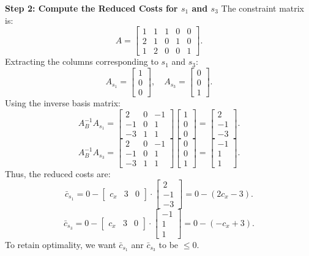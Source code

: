 \textbf{Step 2: Compute the Reduced Costs for \( s_1 \) and \( s_3 \)}
The constraint matrix is:
\[
    A = \begin{bmatrix} 
    1 & 1 & 1 & 0 & 0 \\ 
    2 & 1 & 0 & 1 & 0 \\ 
    1 & 2 & 0 & 0 & 1 
    \end{bmatrix}.
\]
Extracting the columns corresponding to \( s_1 \) and \( s_3 \):
\[
    A_{s_1} = \begin{bmatrix} 1 \\ 0 \\ 0 \end{bmatrix}, \quad
    A_{s_3} = \begin{bmatrix} 0 \\ 0 \\ 1 \end{bmatrix}.
\]
Using the inverse basis matrix:
\[
    A_B^{-1} A_{s_1} = 
    \begin{bmatrix} 
    2 & 0 & -1 \\ 
    -1 & 0 & 1 \\ 
    -3 & 1 & 1
    \end{bmatrix}
    \begin{bmatrix} 1 \\ 0 \\ 0 \end{bmatrix} =
    \begin{bmatrix} 2 \\ -1 \\ -3 \end{bmatrix}.
\]
\[
    A_B^{-1} A_{s_3} = 
    \begin{bmatrix} 
    2 & 0 & -1 \\ 
    -1 & 0 & 1 \\ 
    -3 & 1 & 1
    \end{bmatrix}
    \begin{bmatrix} 0 \\ 0 \\ 1 \end{bmatrix} =
    \begin{bmatrix} -1 \\ 1 \\ 1 \end{bmatrix}.
\]
Thus, the reduced costs are:
\[
    \bar{c}_{s_1} = 0 - \begin{bmatrix} c_x & 3 & 0 \end{bmatrix} \cdot \begin{bmatrix} 2 \\ -1 \\ -3 \end{bmatrix}
    = 0 - (2c_x - 3).
\]
\[
    \bar{c}_{s_3} = 0 - \begin{bmatrix} c_x & 3 & 0 \end{bmatrix} \cdot \begin{bmatrix} -1 \\ 1 \\ 1 \end{bmatrix}
    = 0 - (-c_x + 3).
\]
To retain optimality, we want $\bar{c}_{s_1}$ anr $\bar{c}_{s_3}$ to be $\leq 0$.

